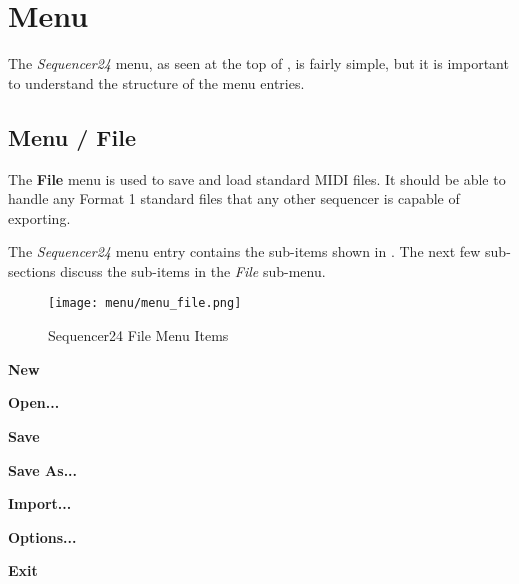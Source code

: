 %
%
%

\section{Menu}
\label{sec:seq24_menu}

   The \textsl{Sequencer24} menu, as seen at the top of
   ,
   is fairly simple, but it is important to understand the
   structure of the menu entries.

\subsection{Menu / File}
\label{subsec:seq24_menu_file}

   The \textbf{File} menu is used to save and load standard 
   MIDI files.  It should be able to handle any 
   Format 1 standard files that any other sequencer 
   is capable of exporting.  

   The \textsl{Sequencer24}
   menu entry contains the sub-items shown in
   .
   The next few sub-sections discuss the sub-items in the 
   \textsl{File} sub-menu.

\begin{figure}[H]
   \centering 
   \texttt{[image: menu/menu\_file.png]}
   \caption{Sequencer24 File Menu Items}
   \label{fig:seq24_menu_file_items}
\end{figure}

   \begin{enumber}
      \item \textbf{New}
      \item \textbf{Open...}
      \item \textbf{Save}
      \item \textbf{Save As...}
      \item \textbf{Import...}
      \item \textbf{Options...}
      \item \textbf{Exit}
   \end{enumber}

